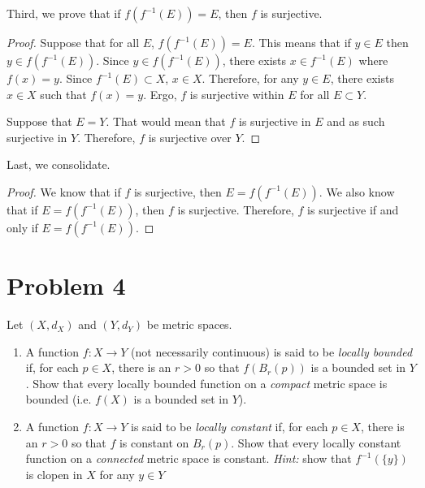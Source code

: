 \documentclass[11pt]{article}
\begin{document}
        Third, we prove that if $f(f^{-1}(E)) = E$, then $f$ is surjective.
        \begin{proof}
            Suppose that for all $E$, $f(f^{-1}(E)) = E$.
            This means that if $y \in E$ then $y \in f(f^{-1}(E))$.
            Since $y \in f(f^{-1}(E))$, there exists $x \in f^{-1}(E)$ where $f(x) = y$.
            Since $f^{-1}(E) \subset X$, $x \in X$.
            Therefore, for any $y \in E$, there exists $x \in X$ such that $f(x) = y$.
            Ergo, $f$ is surjective within $E$ for all $E \subset Y$.

            Suppose that $E = Y$.
            That would mean that $f$ is surjective in $E$ and as such surjective in $Y$.
            Therefore, $f$ is surjective over $Y$.
        \end{proof}

        Last, we consolidate.
        \begin{proof}
            We know that if $f$ is surjective, then $E = f(f^{-1}(E))$.
            We also know that if $E = f(f^{-1}(E))$, then $f$ is surjective.
            Therefore, $f$ is surjective if and only if $E = f(f^{-1}(E))$.
        \end{proof}

\pagebreak
\section{Problem 4}
    Let $(X, d_X)$ and $(Y, d_Y)$ be metric spaces.
    \begin{enumerate}[label=(\alph*)]
        \item 
        A function $f : X \to Y$ (not necessarily continuous) is said to be \textit{locally bounded} if, for each $p \in X$, there is an $r > 0$ so that $f(B_r(p))$ is a bounded set in $Y$. Show that every locally bounded function on a \textit{compact} metric space is bounded (i.e. $f(X)$ is a bounded set in $Y$).

        \item 
        A function $f : X \to Y$ is said to be \textit{locally constant} if, for each $p \in X$, there is an $r > 0$ so that $f$ is constant on $B_r(p)$. Show that every locally constant function on a \textit{connected} metric space is constant. \textit{Hint:} show that $f^{-1}(\{y\})$ is clopen in $X$ for any $y \in Y$
        
    \end{enumerate}
\end{document}
